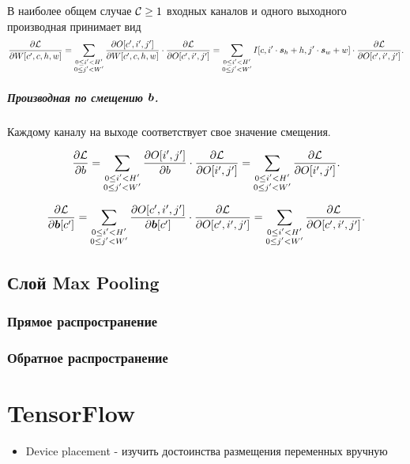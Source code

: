 \documentclass{book}
\numberwithin{theorem}{chapter}
\numberwithin{statement}{chapter}
\numberwithin{lemma}{chapter}
\theoremstyle{definition}
\numberwithin{task}{chapter}
\theoremstyle{remark}
\numberwithin{example}{chapter}
\theoremstyle{definition}
\numberwithin{definition}{chapter}
\theoremstyle{remark}
\theoremstyle{remark}
\numberwithin{lyrics}{section}
\begin{document}
В наиболее общем случае $\mathcal{C}\ge 1$ входных каналов и одного выходного производная принимает вид
\begin{gather}
\frac{\partial \mathcal{L} }{\partial W[c', c, h, w]} = \sum\limits_{\substack{0 \le i' < H' \\ 0 \le j' < W'}} \frac{\partial O[c', i', j'] }{\partial W[c', c, h, w]} \cdot  \frac{\partial \mathcal{L} }{\partial O[c', i', j']} = \sum\limits_{\substack{0 \le i' < H' \\ 0 \le j' < W'}} I[c, i' \cdot \boldsymbol{s}_h + h, j' \cdot \boldsymbol{s}_w + w] \cdot \frac{\partial \mathcal{L} }{\partial O[c', i', j']}.
\end{gather}

\paragraph{Производная по смещению $\boldsymbol{b}$.}
Каждому каналу на выходе соответствует свое значение смещения.

\begin{equation}
\frac{\partial \mathcal{L} }{\partial b} = \sum\limits_{\substack{0 \le i' < H' \\ 0 \le j' < W'}} \frac{\partial O[i', j'] }{\partial b} \cdot \frac{\partial \mathcal{L} }{\partial O[i', j']} = \sum\limits_{\substack{0 \le i' < H' \\ 0 \le j' < W'}} \frac{\partial \mathcal{L} }{\partial O[i', j']}.
\end{equation}

\begin{equation}
\frac{\partial \mathcal{L} }{\partial \boldsymbol{b}[c']} = \sum\limits_{\substack{0 \le i' < H' \\ 0 \le j' < W'}} \frac{\partial O[c', i', j'] }{\partial \boldsymbol{b}[c']} \cdot \frac{\partial \mathcal{L} }{\partial O[c', i', j']} = \sum\limits_{\substack{0 \le i' < H' \\ 0 \le j' < W'}} \frac{\partial \mathcal{L} }{\partial O[c', i', j']}.
\end{equation}

\section{Слой Max Pooling}

\subsection{Прямое распространение}



\subsection{Обратное распространение}

\chapter{TensorFlow}

\begin{itemize}
	\item Device placement - изучить достоинства размещения переменных вручную
\end{itemize}



\end{document}
